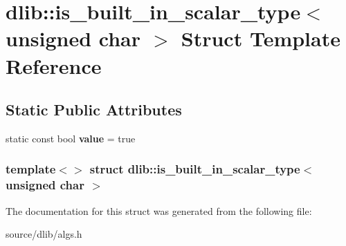 \hypertarget{structdlib_1_1is__built__in__scalar__type_3_01unsigned_01char_01_4}{
\section{dlib::is\_\-built\_\-in\_\-scalar\_\-type$<$ unsigned char $>$ Struct Template Reference}
\label{structdlib_1_1is__built__in__scalar__type_3_01unsigned_01char_01_4}
}
\subsection*{Static Public Attributes}
\begin{DoxyCompactItemize}
\item 
\hypertarget{structdlib_1_1is__built__in__scalar__type_3_01unsigned_01char_01_4_a96d55540506365cf76fc0d61eb93357f}{
static const bool {\bfseries value} = true}
\label{structdlib_1_1is__built__in__scalar__type_3_01unsigned_01char_01_4_a96d55540506365cf76fc0d61eb93357f}

\end{DoxyCompactItemize}
\subsubsection*{template$<$$>$ struct dlib::is\_\-built\_\-in\_\-scalar\_\-type$<$ unsigned char $>$}



The documentation for this struct was generated from the following file:\begin{DoxyCompactItemize}
\item 
source/dlib/algs.h\end{DoxyCompactItemize}

